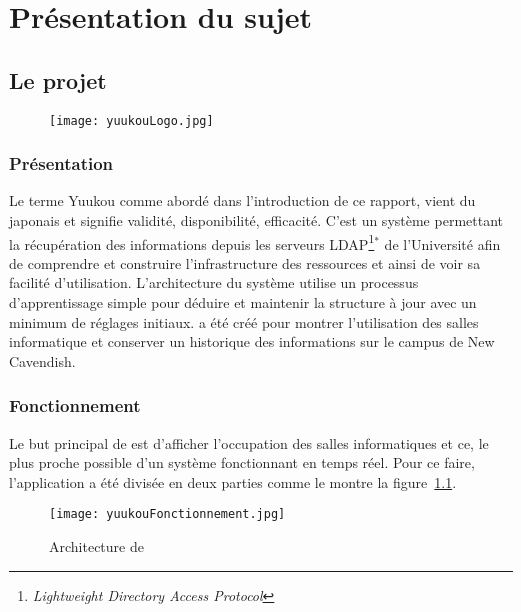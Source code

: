 \chapter{Pr\'esentation du sujet}

\section{Le projet \Yuukou}

\begin{figure}[!ht]
	\centering
	\texttt{[image: yuukouLogo.jpg]}

\end{figure}

\subsection{Pr\'esentation}

Le terme Yuukou comme abord\'e dans l'introduction de ce rapport, vient du japonais \Yuukou{} et signifie validit\'e, disponibilit\'e, efficacit\'e.
C'est un syst\`eme permettant la r\'ecup\'eration des informations depuis les serveurs LDAP\protect\footnote{\textit{Lightweight Directory Access Protocol}}$^*$ de l'Universit\'e afin de comprendre et construire l'infrastructure des ressources et ainsi de voir sa facilit\'e d'utilisation. 
L'architecture du syst\`eme utilise un processus d'apprentissage simple pour d\'eduire et maintenir la structure \`a jour avec un minimum de r\'eglages initiaux.
\Yuukou{} a \'et\'e cr\'e\'e pour montrer l'utilisation des salles informatique et conserver un historique des informations sur le campus de New Cavendish.

\subsection{Fonctionnement}

Le but principal de \Yuukou{} est d'afficher l'occupation des salles informatiques et ce, le plus proche possible d'un syst\`eme fonctionnant en temps r\'eel.
Pour ce faire, l'application a \'et\'e divis\'ee en deux parties  comme le montre la figure~\ref{figure:yuukouFonctionnement}.

\clearpage

\begin{figure}[!ht]
	\centering
	\texttt{[image: yuukouFonctionnement.jpg]}
	\caption{Architecture de \Yuukou}
	\label{figure:yuukouFonctionnement}

\end{figure}

